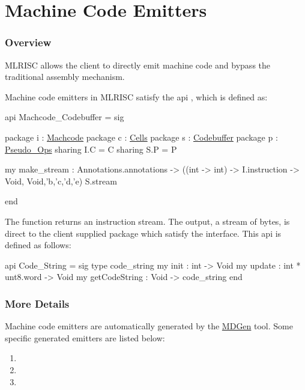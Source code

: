 \section{Machine Code Emitters}

\subsubsection{Overview}
MLRISC allows the client to directly emit machine code and bypass the traditional
assembly mechanism. 

Machine code emitters in MLRISC satisfy the api 
,
which is defined as:
\begin{SML}
api Machcode_Codebuffer =
sig

   package i : \href{instructions.html}{Machcode}
   package c : \href{cells.html}{Cells}
   package s : \href{streams.html}{Codebuffer}
   package p : \href{pseudo-ops.html}{Pseudo_Ops}
      sharing I.C = C  
      sharing S.P = P

   my make_stream : Annotations.annotations ->
                     ((int -> int) -> I.instruction -> Void,
                      Void,'b,'c,'d,'e) S.stream

end
\end{SML}

The function  returns an instruction stream.
The output, a stream of bytes, is direct to the client supplied
package which satisfy the 
 interface.
This api is defined as follows:
\begin{SML}
api Code_String = sig
  type code_string
  my init          : int -> Void
  my update        : int * unt8.word -> Void
  my getCodeString : Void -> code_string
end
\end{SML}

\subsubsection{More Details}

Machine code emitters are automatically generated by the 
\href{mlrisc-md.html}{MDGen} tool.  Some specific generated
emitters are listed below:
\begin{enumerate}
 \item {}
 \item {}
 \item {}
\end{enumerate}
